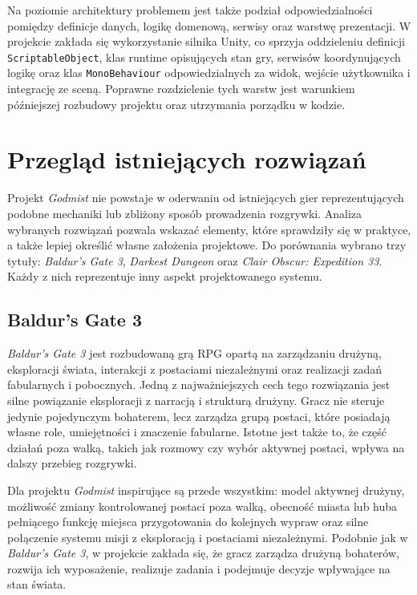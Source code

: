 Na poziomie architektury problemem jest także podział odpowiedzialności pomiędzy definicje danych, logikę domenową, serwisy oraz warstwę prezentacji. W projekcie zakłada się wykorzystanie silnika Unity, co sprzyja oddzieleniu definicji \texttt{ScriptableObject}, klas runtime opisujących stan gry, serwisów koordynujących logikę oraz klas \texttt{MonoBehaviour} odpowiedzialnych za widok, wejście użytkownika i integrację ze sceną. Poprawne rozdzielenie tych warstw jest warunkiem późniejszej rozbudowy projektu oraz utrzymania porządku w kodzie.

\section{Przegląd istniejących rozwiązań}
\label{sec:przeglad-rozwiazan}

Projekt \emph{Godmist} nie powstaje w oderwaniu od istniejących gier reprezentujących podobne mechaniki lub zbliżony sposób prowadzenia rozgrywki. Analiza wybranych rozwiązań pozwala wskazać elementy, które sprawdziły się w praktyce, a także lepiej określić własne założenia projektowe. Do porównania wybrano trzy tytuły: \emph{Baldur's Gate 3}, \emph{Darkest Dungeon} oraz \emph{Clair Obscur: Expedition 33}. Każdy z nich reprezentuje inny aspekt projektowanego systemu.

\subsection{Baldur's Gate 3}
\label{subsec:bg3}

\emph{Baldur's Gate 3} jest rozbudowaną grą RPG opartą na zarządzaniu drużyną, eksploracji świata, interakcji z postaciami niezależnymi oraz realizacji zadań fabularnych i pobocznych. Jedną z najważniejszych cech tego rozwiązania jest silne powiązanie eksploracji z narracją i strukturą drużyny. Gracz nie steruje jedynie pojedynczym bohaterem, lecz zarządza grupą postaci, które posiadają własne role, umiejętności i znaczenie fabularne. Istotne jest także to, że część działań poza walką, takich jak rozmowy czy wybór aktywnej postaci, wpływa na dalszy przebieg rozgrywki.

Dla projektu \emph{Godmist} inspirujące są przede wszystkim: model aktywnej drużyny, możliwość zmiany kontrolowanej postaci poza walką, obecność miasta lub huba pełniącego funkcję miejsca przygotowania do kolejnych wypraw oraz silne połączenie systemu misji z eksploracją i postaciami niezależnymi. Podobnie jak w \emph{Baldur's Gate 3}, w projekcie zakłada się, że gracz zarządza drużyną bohaterów, rozwija ich wyposażenie, realizuje zadania i podejmuje decyzje wpływające na stan świata.

